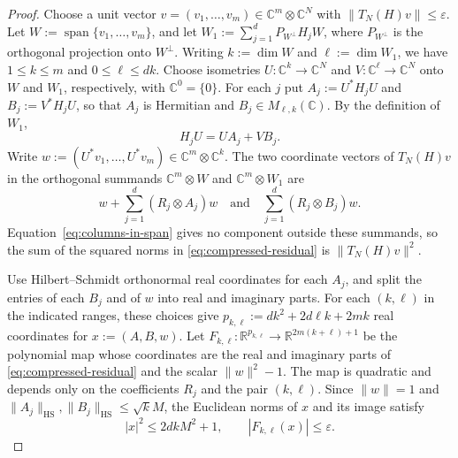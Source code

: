 \begin{proof}
Choose a unit vector $v=(v_1,\ldots,v_m)\in\mathbb C^m\otimes\mathbb C^N$ with $\|T_N(H)v\|\le\varepsilon$.
Let $W:=\operatorname{span}\{v_1,\ldots,v_m\}$, and let $W_1:=\sum_{j=1}^d P_{W^\perp}H_jW$, where $P_{W^\perp}$ is the orthogonal projection onto $W^\perp$.
Writing $k:=\dim W$ and $\ell:=\dim W_1$, we have $1\le k\le m$ and $0\le\ell\le dk$.
Choose isometries $U:\mathbb C^k\to\mathbb C^N$ and $V:\mathbb C^\ell\to\mathbb C^N$ onto $W$ and $W_1$, respectively, with $\mathbb C^0=\{0\}$.
For each $j$ put $A_j:=U^*H_jU$ and $B_j:=V^*H_jU$, so that $A_j$ is Hermitian and $B_j\in M_{\ell,k}(\mathbb C)$.
By the definition of $W_1$,
\begin{equation}\label{eq:columns-in-span}
 H_jU=UA_j+VB_j.
\end{equation}
Write $w:=(U^*v_1,\ldots,U^*v_m)\in\mathbb C^m\otimes\mathbb C^k$.
The two coordinate vectors of $T_N(H)v$ in the orthogonal summands $\mathbb C^m\otimes W$ and $\mathbb C^m\otimes W_1$ are
\begin{equation}\label{eq:compressed-residual}
 w+\sum_{j=1}^d(R_j\otimes A_j)w
 \quad\text{and}\quad
 \sum_{j=1}^d(R_j\otimes B_j)w.
\end{equation}
Equation~\eqref{eq:columns-in-span} gives no component outside these summands, so the sum of the squared norms in \eqref{eq:compressed-residual} is $\|T_N(H)v\|^2$.

Use Hilbert--Schmidt orthonormal real coordinates for each $A_j$, and split the entries of each $B_j$ and of $w$ into real and imaginary parts.
For each $(k,\ell)$ in the indicated ranges, these choices give $p_{k,\ell}:=dk^2+2d\ell k+2mk$ real coordinates for $x:=(A,B,w)$.
Let $F_{k,\ell}:\mathbb R^{p_{k,\ell}}\to\mathbb R^{2m(k+\ell)+1}$ be the polynomial map whose coordinates are the real and imaginary parts of \eqref{eq:compressed-residual} and the scalar $\|w\|^2-1$.
The map is quadratic and depends only on the coefficients $R_j$ and the pair $(k,\ell)$.
Since $\|w\|=1$ and $\|A_j\|_{\mathrm{HS}},\|B_j\|_{\mathrm{HS}}\le\sqrt{k}M$, the Euclidean norms of $x$ and its image satisfy
\begin{equation}\label{eq:compressed-input-bounds}
 |x|^2\le 2dkM^2+1,
 \qquad
 |F_{k,\ell}(x)|\le\varepsilon.
\end{equation}


\end{proof}
